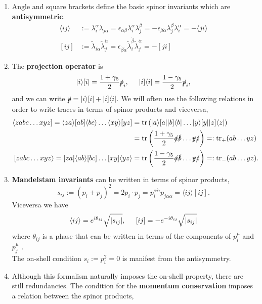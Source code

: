 \begin{enumerate}
	\item Angle and square brackets define the basic spinor invariants which are \textbf{antisymmetric}.
	\begin{align*}
		\langle ij\rangle&:= \lambda_i^\alpha \lambda_{j\alpha}=\epsilon_{\alpha\beta} \lambda_i^\alpha \lambda_j^\beta=-\epsilon_{\beta\alpha}\lambda_j^\beta \lambda_i^\alpha =-\langle ji \rangle\\
		[ij]&:= \tilde\lambda_{i\dot\alpha}\tilde\lambda_j^{\dot\alpha}=\epsilon_{\dot\beta\dot\alpha}\tilde\lambda_{i}^{\dot\beta}\tilde \lambda_{j}^{\dot\alpha}=-[ji]
	\end{align*}
	\item The \textbf{projection operator} is
	$$
		| i \rangle[ i |= \frac{1+\gamma_5}{2}\slashed p_i, \hspace{0.5cm} |i]\langle i|=\frac{1-\gamma_5}{2}\slashed p_i,
	$$
	and we can write 
	$
		\slashed p=|i\rangle[i|+|i]\langle i|.
	$
	We will often use the following relations in order to write traces in terms of spinor products and viceversa,
	\begin{align*}
		\langle z abc\dots xy z]=\langle z a \rangle [a b] \langle b c\rangle \dots \langle x y \rangle [y z]&= \tr \left(|a\rangle [a||b]\langle b| \dots |y \rangle[y||z]\langle z|\right)\\
		&=\tr\left(\frac{1+\gamma_5}{2}\slashed a \slashed b \dots \slashed y \slashed z\right)=:\tr_+(ab\dots yz)\\
		[z abc\dots xy z\rangle=[z a]\langle ab \rangle [bc] \dots [xy]\langle y z\rangle&=\tr\left(\frac{1-\gamma_5}{2}\slashed a \slashed b \dots \slashed y \slashed z\right)=:\tr_-(ab\dots yz).
	\end{align*}
	\item \textbf{Mandelstam invariants} can be written in terms of spinor products,
	$$
		s_{ij}:=(p_i+p_j)^2=2p_i\cdot p_j=p_i^{\alpha\dot\alpha}p_{j\alpha\dot\alpha}=\langle ij \rangle[ij].
	$$
	Viceversa we have
	$$
		\langle ij \rangle= e^{i \theta_{ij}} \sqrt{|s_{ij}|}, \hspace{0.5cm} [ij]=-e^{-i\theta_{ij}}\sqrt{|s_{ij}|}
	$$
	where $\theta_{ij}$ is a phase that can be written in terms of the components of $p_i^\mu$ and $p_j^\mu$ \cite{Henn:2014yza}.\\
	The on-shell condition $s_i:=p_i^2=0$ is manifest from the antisymmetry.
	\item Although this formalism naturally imposes the on-shell property, there are still redundancies. The condition for the \textbf{momentum conservation} imposes a relation between the spinor products,

\end{enumerate}
